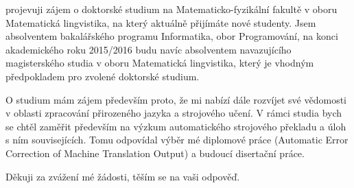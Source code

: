 \documentclass[11pt,a4paper,times]{moderncv} %
\begin{document}
\makelettertitle %

projevuji z\'{a}jem o doktorsk\'{e} studium na Matematicko-fyzik\'{a}ln\'{i} fakult\v{e} v oboru Matematick\'{a} lingvistika, na kter\'{y} aktu\'{a}ln\v{e} p\v{r}ij\'{i}m\'{a}te nov\'{e} studenty.
Jsem absolventem bakal\'{a}\v{r}sk\'{e}ho programu Informatika, obor Programov\'{a}n\'{i},
na konci akademick\'{e}ho roku 2015/2016 budu nav\'{i}c absolventem navazuj\'{i}c\'{i}ho magistersk\'{e}ho studia v oboru Matematick\'{a} lingvistika, kter\'{y} je vhodn\'{y}m
p\v{r}edpokladem pro zvolen\'{e} doktorsk\'{e} studium.

O studium m\'{a}m z\'{a}jem p\v{r}edev\v{s}\'{i}m proto, \v{z}e mi nab\'{i}z\'{i} d\'{a}le rozv\'{i}jet sv\'{e} v\v{e}domosti v oblasti zpracov\'{a}n\'{i} p\v{r}irozen\'{e}ho jazyka a strojov\'{e}ho u\v{c}en\'{i}. V r\'{a}mci studia bych se cht\v{e}l
zam\v{e}\v{r}it p\v{r}edev\v{s}\'{i}m na v\'{y}zkum automatick\'{e}ho strojov\'{e}ho p\v{r}ekladu a \'{u}loh s n\'{i}m souvisej\'{i}c\'{i}ch. Tomu odpov\'{i}dal v\'{y}b\v{e}r m\'{e} diplomov\'{e} pr\'{a}ce
(Automatic Error Correction of Machine Translation Output) a budouc\'{i} diserta\v{c}n\'{i} pr\'{a}ce. 

D\v{e}kuji za zv\'{a}\v{z}en\'{i} m\'{e} \v{z}\'{a}dosti, t\v{e}\v{s}\'{i}m se na va\v{s}i odpov\v{e}\v{d}.

\makeletterclosing %

\end{document}
